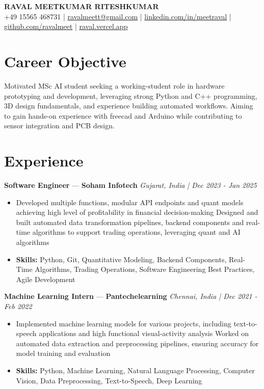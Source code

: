 \documentclass[a4paper,10pt]{article}
\begin{document}
\begin{center}
  {\Large\bfseries RAVAL MEETKUMAR RITESHKUMAR}\\[2pt]
  {\small +49 15565 468731 \;|\; \href{mailto:ravalmeett@gmail.com}{ravalmeett@gmail.com} \;|\; \href{https://www.linkedin.com/in/meetraval/}{linkedin.com/in/meetraval} \;|\; \href{https://github.com/ravalmeet}{github.com/ravalmeet} \;|\; \href{https://raval.vercel.app/}{raval.vercel.app}}
\end{center}
\vspace{-3pt}

\section*{Career Objective}
Motivated MSc AI student seeking a working-student role in hardware prototyping and development, leveraging strong Python and C++ programming, 3D design fundamentals, and experience building automated workflows. Aiming to gain hands-on experience with freecad and Arduino while contributing to sensor integration and PCB design.\par

\section*{Experience}
\textbf{Software Engineer} — \textbf{Soham Infotech} \hfill \textit{Gujarat, India \;|\; Dec 2023 - Jan 2025}\par
\vspace{1pt}
\begin{itemize}
  \item Developed multiple functions, modular API endpoints and quant models achieving high level of profitability in financial decision-making Designed and built automated data transformation pipelines, backend components and real-time algorithms to support trading operations, leveraging quant and AI algorithms
  \item \textbf{Skills:} Python, Git, Quantitative Modeling, Backend Components, Real-Time Algorithms, Trading Operations, Software Engineering Best Practices, Agile Development
\end{itemize}
\vspace{3pt}
\textbf{Machine Learning Intern} — \textbf{Pantechelearning} \hfill \textit{Chennai, India \;|\; Dec 2021 - Feb 2022}\par
\vspace{1pt}
\begin{itemize}
  \item Implemented machine learning models for various projects, including text-to-speech applications and high functional visual-activity analysis Worked on automated data extraction and preprocessing pipelines, ensuring accuracy for model training and evaluation
  \item \textbf{Skills:} Python, Machine Learning, Natural Language Processing, Computer Vision, Data Preprocessing, Text-to-Speech, Deep Learning
\end{itemize}
\end{document}
